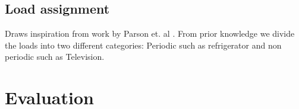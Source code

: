 \documentclass[conference]{IEEEtran}
\begin{document}

\subsection{Load assignment}
Draws inspiration from work by Parson et. al \cite{parson2012_aaai}. From prior knowledge we divide the loads into two different categories: Periodic such as refrigerator and non periodic such as Television.

\section{Evaluation}
\end{document}
